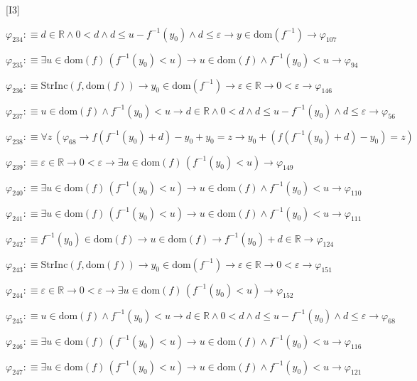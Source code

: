 \begin{fullproof}{[I3]}
\begin{abbrevlist}
\item $\varphi_{234} :\equiv d \in \mathbb{R} \land 0 < d \land d \leq u - f^{-1}(y_{0}) \land d \leq \varepsilon \to y \in \mathrm{dom}(f^{-1}) \to \varphi_{107}$
\item $\varphi_{235} :\equiv \exists u \in \mathrm{dom}(f)\,(f^{-1}(y_{0}) < u) \to u \in \mathrm{dom}(f) \land f^{-1}(y_{0}) < u \to \varphi_{94}$
\item $\varphi_{236} :\equiv \mathrm{StrInc}(f,\mathrm{dom}(f)) \to y_{0} \in \mathrm{dom}(f^{-1}) \to \varepsilon \in \mathbb{R} \to 0 < \varepsilon \to \varphi_{146}$
\item $\varphi_{237} :\equiv u \in \mathrm{dom}(f) \land f^{-1}(y_{0}) < u \to d \in \mathbb{R} \land 0 < d \land d \leq u - f^{-1}(y_{0}) \land d \leq \varepsilon \to \varphi_{56}$
\item $\varphi_{238} :\equiv \forall z\,(\varphi_{68} \to f(f^{-1}(y_{0}) + d) - y_{0} + y_{0} = z \to y_{0} + (f(f^{-1}(y_{0}) + d) - y_{0}) = z)$
\item $\varphi_{239} :\equiv \varepsilon \in \mathbb{R} \to 0 < \varepsilon \to \exists u \in \mathrm{dom}(f)\,(f^{-1}(y_{0}) < u) \to \varphi_{149}$
\item $\varphi_{240} :\equiv \exists u \in \mathrm{dom}(f)\,(f^{-1}(y_{0}) < u) \to u \in \mathrm{dom}(f) \land f^{-1}(y_{0}) < u \to \varphi_{110}$
\item $\varphi_{241} :\equiv \exists u \in \mathrm{dom}(f)\,(f^{-1}(y_{0}) < u) \to u \in \mathrm{dom}(f) \land f^{-1}(y_{0}) < u \to \varphi_{111}$
\item $\varphi_{242} :\equiv f^{-1}(y_{0}) \in \mathrm{dom}(f) \to u \in \mathrm{dom}(f) \to f^{-1}(y_{0}) + d \in \mathbb{R} \to \varphi_{124}$
\item $\varphi_{243} :\equiv \mathrm{StrInc}(f,\mathrm{dom}(f)) \to y_{0} \in \mathrm{dom}(f^{-1}) \to \varepsilon \in \mathbb{R} \to 0 < \varepsilon \to \varphi_{151}$
\item $\varphi_{244} :\equiv \varepsilon \in \mathbb{R} \to 0 < \varepsilon \to \exists u \in \mathrm{dom}(f)\,(f^{-1}(y_{0}) < u) \to \varphi_{152}$
\item $\varphi_{245} :\equiv u \in \mathrm{dom}(f) \land f^{-1}(y_{0}) < u \to d \in \mathbb{R} \land 0 < d \land d \leq u - f^{-1}(y_{0}) \land d \leq \varepsilon \to \varphi_{68}$
\item $\varphi_{246} :\equiv \exists u \in \mathrm{dom}(f)\,(f^{-1}(y_{0}) < u) \to u \in \mathrm{dom}(f) \land f^{-1}(y_{0}) < u \to \varphi_{116}$
\item $\varphi_{247} :\equiv \exists u \in \mathrm{dom}(f)\,(f^{-1}(y_{0}) < u) \to u \in \mathrm{dom}(f) \land f^{-1}(y_{0}) < u \to \varphi_{121}$

\end{abbrevlist}
\end{fullproof}
